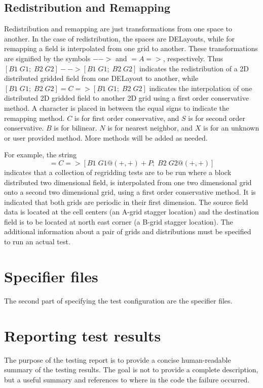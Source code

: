 \documentclass{article}
\begin{document}
\subsection{Redistribution and Remapping}
Redistribution and remapping are just transformations from one space to another. In the case of redistribution, the spaces are DELayouts, while for remapping a field is interpolated from one grid to another. These transformations are signified by the symbols $-->$ and $=A=>$, respectively. Thus 
$[ B1 \; G1;\; B2 \; G2 ] -- \!\!\! >  [ B1 \; G1;\; B2 \; G2 ]$ indicates the redistribution of a 2D distributed gridded field from one DELayout to another, while $[ B1 \; G1;\; B2 \; G2 ] =C=>  [ B1 \; G1;\; B2 \; G2 ]$ indicates the interpolation of one distributed 2D gridded field to another 2D grid using a first order conservative method. A character is placed in between the equal signs to indicate the remapping method. $C$ is for first order conservative, and $S$ is for second order conservative. $B$ is for bilinear. $N$ is for nearest neighbor, and $X$ is for an unknown or user provided method. More methods will be added as needed.
 
For example, the string
\begin{displaymath}
[B1 \; G1+P; \; B2 \; G2 ] =C=> [B1 \; G1@(+,+)+P; \; B2 \; G2@(+,+) ] 
\end{displaymath}
indicates that a collection of regridding tests are to be run where a block distributed two dimensional field, is interpolated from one two dimensional grid onto a second two dimensional grid, using a first order conservative method. It is indicated that both grids are periodic in their first dimension. The source field data is located at the cell centers (an A-grid stagger location) and the destination field is to be located at north east corner (a B-grid stagger location). The additional information about a pair of grids and distributions must be specified to run an actual test. 

\section{Specifier files}
The second part of specifying the test configuration are the specifier files. 

\section{Reporting test results}
The purpose of the testing report is to provide a concise human-readable summary of the testing results. The goal is not to provide a complete description, but a useful summary and references to where in the code the failure occurred.
\end{document}
